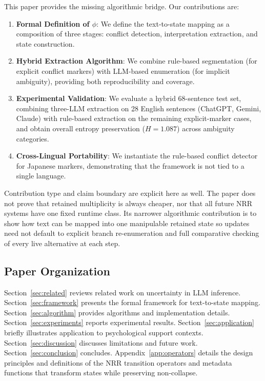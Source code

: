 \documentclass[11pt,a4paper]{article}
\begin{document}
This paper provides the missing algorithmic bridge. Our contributions are:

\begin{enumerate}
    \item \textbf{Formal Definition of $\phi$}: We define the text-to-state mapping as a 
          composition of three stages: conflict detection, interpretation extraction, 
          and state construction.
    
    \item \textbf{Hybrid Extraction Algorithm}: We combine rule-based segmentation 
          (for explicit conflict markers) with LLM-based enumeration (for implicit 
          ambiguity), providing both reproducibility and coverage.
    
    \item \textbf{Experimental Validation}: We evaluate a hybrid 68-sentence test set,
          combining three-LLM extraction on 28 English sentences (ChatGPT, Gemini,
          Claude) with rule-based extraction on the remaining explicit-marker cases,
          and obtain overall entropy preservation ($H = 1.087$) across ambiguity
          categories.
    
	    \item \textbf{Cross-Lingual Portability}: We instantiate the rule-based conflict 
	          detector for Japanese markers, demonstrating that the framework is not 
	          tied to a single language.
\end{enumerate}

Contribution type and claim boundary are explicit here as well. The paper does not prove that retained multiplicity is always cheaper, nor that all future NRR systems have one fixed runtime class. Its narrower algorithmic contribution is to show how text can be mapped into one manipulable retained state so updates need not default to explicit branch re-enumeration and full comparative checking of every live alternative at each step.

\subsection{Paper Organization}

Section~\ref{sec:related} reviews related work on uncertainty in LLM inference. 
Section~\ref{sec:framework} presents the formal framework for text-to-state mapping. 
Section~\ref{sec:algorithm} provides algorithms and implementation details. 
Section~\ref{sec:experiments} reports experimental results. 
Section~\ref{sec:application} briefly illustrates application to psychological support contexts. 
Section~\ref{sec:discussion} discusses limitations and future work. 
Section~\ref{sec:conclusion} concludes. 
Appendix~\ref{app:operators} details the design principles and definitions of 
the NRR transition operators and metadata functions that transform states while preserving non-collapse.
\end{document}
